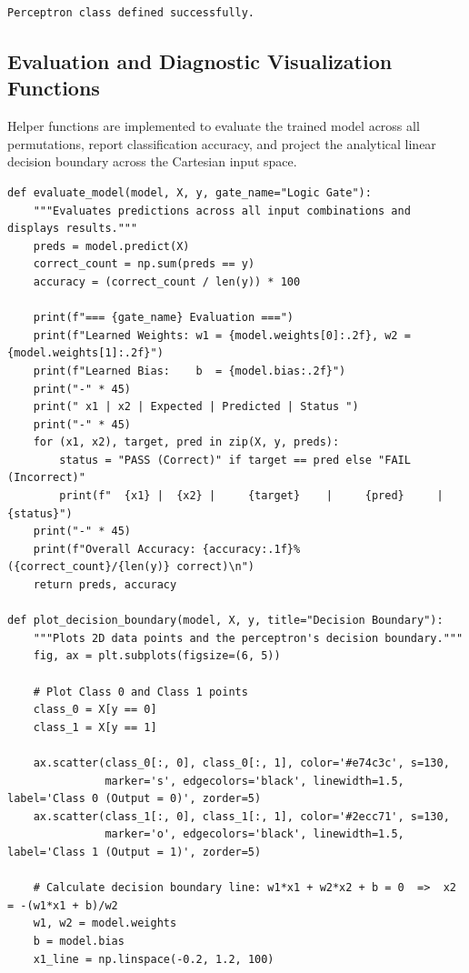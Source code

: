 \documentclass[12pt]{article}
\begin{document}
\begin{lstlisting}[style=output]
Perceptron class defined successfully.
\end{lstlisting}

\subsection{Evaluation and Diagnostic Visualization Functions}
Helper functions are implemented to evaluate the trained model across all permutations, report classification accuracy, and project the analytical linear decision boundary across the Cartesian input space.

\begin{lstlisting}[style=code]
def evaluate_model(model, X, y, gate_name="Logic Gate"):
    """Evaluates predictions across all input combinations and displays results."""
    preds = model.predict(X)
    correct_count = np.sum(preds == y)
    accuracy = (correct_count / len(y)) * 100
    
    print(f"=== {gate_name} Evaluation ===")
    print(f"Learned Weights: w1 = {model.weights[0]:.2f}, w2 = {model.weights[1]:.2f}")
    print(f"Learned Bias:    b  = {model.bias:.2f}")
    print("-" * 45)
    print(" x1 | x2 | Expected | Predicted | Status ")
    print("-" * 45)
    for (x1, x2), target, pred in zip(X, y, preds):
        status = "PASS (Correct)" if target == pred else "FAIL (Incorrect)"
        print(f"  {x1} |  {x2} |     {target}    |     {pred}     | {status}")
    print("-" * 45)
    print(f"Overall Accuracy: {accuracy:.1f}% ({correct_count}/{len(y)} correct)\n")
    return preds, accuracy

def plot_decision_boundary(model, X, y, title="Decision Boundary"):
    """Plots 2D data points and the perceptron's decision boundary."""
    fig, ax = plt.subplots(figsize=(6, 5))
    
    # Plot Class 0 and Class 1 points
    class_0 = X[y == 0]
    class_1 = X[y == 1]
    
    ax.scatter(class_0[:, 0], class_0[:, 1], color='#e74c3c', s=130, 
               marker='s', edgecolors='black', linewidth=1.5, label='Class 0 (Output = 0)', zorder=5)
    ax.scatter(class_1[:, 0], class_1[:, 1], color='#2ecc71', s=130, 
               marker='o', edgecolors='black', linewidth=1.5, label='Class 1 (Output = 1)', zorder=5)
    
    # Calculate decision boundary line: w1*x1 + w2*x2 + b = 0  =>  x2 = -(w1*x1 + b)/w2
    w1, w2 = model.weights
    b = model.bias
    x1_line = np.linspace(-0.2, 1.2, 100)
    

\end{lstlisting}
\end{document}
